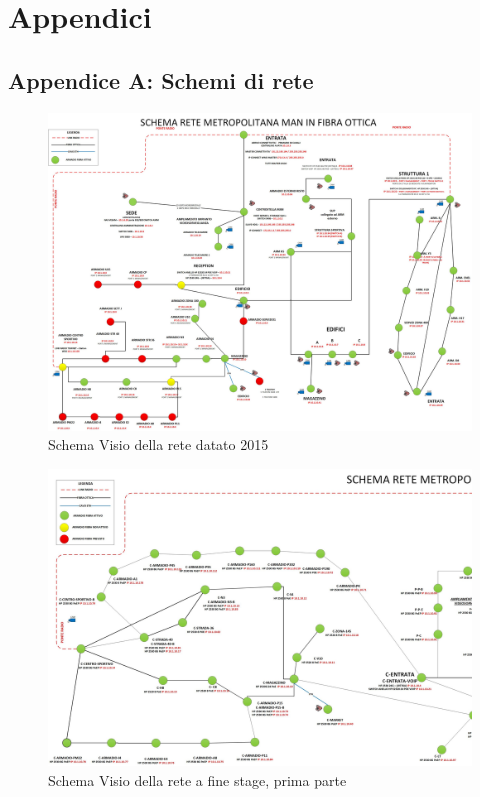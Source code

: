 \documentclass[Tesi.tex]{subfiles}
\begin{document}
	
\renewcommand{\leftmark}{Appendici}
\chapter*{Appendici}
	
\label{sec:Appendice A}
\section*{Appendice A: Schemi di rete}

\begin{landscape}
\begin{figure}[H]
	\centering
	\includegraphics[width=0.885\linewidth]{"images/schema_WAN_anonimo_prima"}
	\caption{Schema Visio della rete datato 2015}
	\label{fig:Schema Visio della rete datato 2015}
\end{figure}

\begin{figure}[H]
	\centering
	\includegraphics[width=1\linewidth]{"images/schema_WAN_anonimo_dopo_A"}
	\caption{Schema Visio della rete a fine stage, prima parte}
	\label{fig:Schema Visio della rete a fine stage, prima parte}
\end{figure}


\end{landscape}
\end{document}
